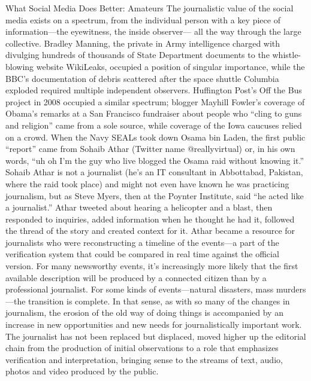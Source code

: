 What Social Media Does Better: Amateurs
The journalistic value of the social media exists on a spectrum, from the individual
person with a key piece of information—the eyewitness, the inside observer—
all the way through the large collective. Bradley Manning, the private in Army
intelligence charged with divulging hundreds of thousands of State Department
documents to the whistle-blowing website WikiLeaks, occupied a position of
singular importance, while the BBC’s documentation of debris scattered after
the space shuttle Columbia exploded required multiple independent observers.
Huffington Post’s Off the Bus project in 2008 occupied a similar spectrum; blogger
Mayhill Fowler’s coverage of Obama’s remarks at a San Francisco fundraiser
about people who ``cling to guns and religion'' came from a sole source, while
coverage of the Iowa caucuses relied on a crowd.
When the Navy SEALs took down Osama bin Laden, the first public ``report''
came from Sohaib Athar (Twitter name @reallyvirtual) or, in his own words, ``uh
oh I’m the guy who live blogged the Osama raid without knowing it.'' Sohaib
Athar is not a journalist (he’s an IT consultant in Abbottabad, Pakistan, where the
raid took place) and might not even have known he was practicing journalism,
but as Steve Myers, then at the Poynter Institute, said ``he acted like a journalist.''
Athar tweeted about hearing a helicopter and a blast, then responded to inquiries,
added information when he thought he had it, followed the thread of the story
and created context for it. Athar became a resource for journalists who were
reconstructing a timeline of the events—a part of the verification system that
could be compared in real time against the official version.
For many newsworthy events, it’s increasingly more likely that the first available
description will be produced by a connected citizen than by a professional journalist.
For some kinds of events—natural disasters, mass murders—the transition
is complete.
In that sense, as with so many of the changes in journalism, the erosion of the old
way of doing things is accompanied by an increase in new opportunities and new
needs for journalistically important work. The journalist has not been replaced
but displaced, moved higher up the editorial chain from the production of initial
observations to a role that emphasizes verification and interpretation, bringing
sense to the streams of text, audio, photos and video produced by the public.

